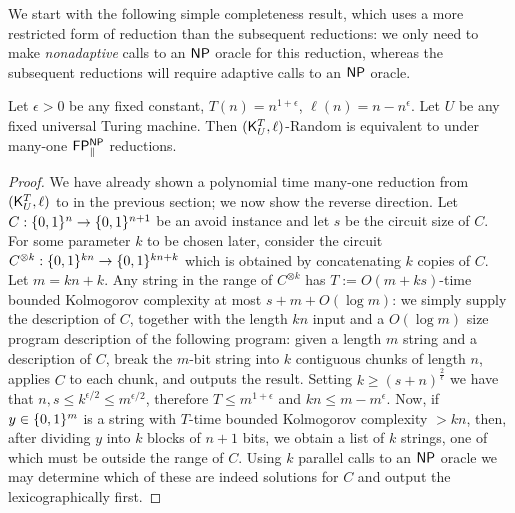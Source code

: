 We start with the following simple completeness result, which uses a more restricted form of reduction than the subsequent reductions: we only need to make \emph{nonadaptive} calls to an $\cl{NP}$ oracle for this reduction, whereas the subsequent reductions will require adaptive calls to an $\cl{NP}$ oracle.
\begin{theorem}\label{range:thm:kt-random-avoid-equivalence}
Let $\epsilon > 0$ be any fixed constant, $T(n) = n^{1+\epsilon}$, $\ell(n) = n - n^{\epsilon}$. Let $U$ be any fixed universal Turing machine. Then {\sc $(\cl{K}^T_U, \ell)$-Random} is equivalent to \avoid under many-one $\cl{FP^{NP}_\Vert}$ reductions.
\end{theorem}
\begin{proof}
We have already shown a polynomial time many-one reduction from $(\cl{K}^T_U, \ell)$ to \avoid in the previous section; we now show the reverse direction. Let $C: \{0,1\}^n \to \{0,1\}^{n+1}$ be an avoid instance and let $s$ be the circuit size of $C$. For some parameter $k$ to be chosen later, consider the circuit $C^{\otimes k} : \{0,1\}^{kn} \to \{0,1\}^{kn + k}$ which is obtained by concatenating $k$ copies of $C$. Let $m = kn + k$. Any string in the range of $C^{\otimes k}$ has $T:= O(m + ks)$-time bounded Kolmogorov complexity at most $s + m + O(\log m)$: we simply supply the description of $C$, together with the length $kn$ input and a $O(\log m)$ size program description of the following program: given a length $m$ string and a description of $C$, break the $m$-bit string into $k$ contiguous chunks of length $n$, applies $C$ to each chunk, and outputs the result. Setting $k\geq (s+ n)^{\frac{2}{\epsilon}}$ we have that $n, s \leq k^{\epsilon/2} \leq m^{\epsilon/2}$, therefore $T \leq m^{1 + \epsilon}$ and $kn \leq m - m^\epsilon$. Now, if $y \in \{0,1\}^m$ is a string with $T$-time bounded Kolmogorov complexity $> kn$, then, after dividing $y$ into $k$ blocks of $n+1$ bits, we obtain a list of $k$ strings, one of which must be outside the range of $C$. Using $k$ parallel calls to an $\cl{NP}$ oracle we may determine which of these are indeed \avoid solutions for $C$ and output the lexicographically first.
\end{proof}

